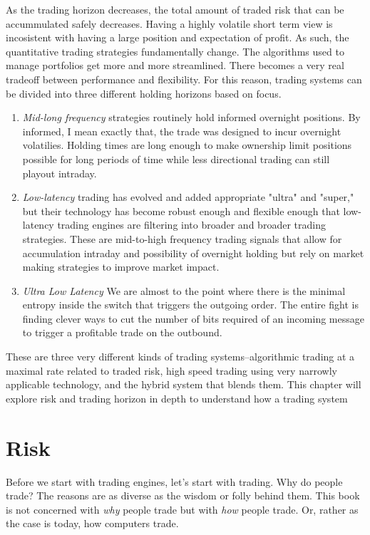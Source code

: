As the trading horizon decreases, the total amount of traded risk that can be
accummulated safely decreases. Having a highly volatile short term view is incosistent
with having a large position and expectation of profit.  As such, the quantitative
trading strategies fundamentally change.  The algorithms used to manage portfolios
get more and more streamlined. There becomes a very real tradeoff between performance
and flexibility.  For this reason, trading systems can be divided into three different
holding horizons based on focus.
\begin{enumerate}
\item \emph{Mid-long frequency} strategies routinely hold informed overnight positions.
By informed, I mean exactly that, the trade was designed to incur overnight volatilies.
Holding times are long enough to make ownership limit positions possible for long
periods of time while less directional trading can still playout intraday.
\item \emph{Low-latency} trading has evolved and added appropriate "ultra" and "super,"
but their technology has become robust enough and flexible enough that low-latency
trading engines are filtering into broader and broader trading strategies.  These
are mid-to-high frequency trading signals that allow for accumulation intraday and
possibility of overnight holding but rely on market making strategies to improve
market impact.
\item \emph{Ultra Low Latency} We are almost to the point where there is the minimal
entropy inside the switch that triggers the outgoing order.  The entire fight is
finding clever ways to cut the number of bits required of an incoming message to
trigger a profitable trade on the outbound.
\end{enumerate}

These are three very different kinds of trading systems--algorithmic trading at
a maximal rate related to traded risk, high speed trading using very narrowly
applicable technology, and the hybrid system that blends them.  This chapter will
explore risk and trading horizon in depth to understand how a trading system

\section{Risk}

Before we start with trading engines, let's start with trading.  Why do people trade?
The reasons are as diverse as the wisdom or folly behind them.  This book is not
concerned with \textit{why} people trade but with \textit{how} people trade. Or,
rather as the case is today, how computers trade.

